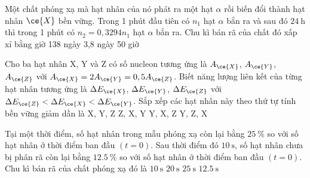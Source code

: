 \begin{ex}
	Một chất phóng xạ mà hạt nhân của nó phát ra một hạt $\alpha$ rồi biến đổi thành hạt nhân $\ce{X}$ bền vững. Trong 1 phút đầu tiên có $n_1$ hạt $\alpha$ bắn ra và sau đó $\SI{24}{\hour}$ thì trong 1 phút có $n_2=0,3294n_1$ hạt $\alpha$ bắn ra. Chu kì bán rã của chất đó xấp xỉ bằng
	\choice
	{ giờ}
	{138 ngày}
	{3,8 ngày}
	{50 giờ}
\end{ex}
\begin{ex}
	Cho ba hạt nhân X, Y và Z có số nucleon tương ứng là $A_{\ce{X}}$, $A_{\ce{Y}}$, $A_{\ce{Z}}$ với $A_{\ce{X}}=2A_{\ce{Y}}=0,5A_{\ce{Z}}$. Biết năng lượng liên kết của từng hạt nhân tương ứng là $\Delta E_{\ce{X}}$, $\Delta E_{\ce{Y}}$, $\Delta E_{\ce{Z}}$ với $\Delta E_{\ce{Z}}<\Delta E_{\ce{X}}<\Delta E_{\ce{Y}}$. Sắp xếp các hạt nhân này theo thứ tự tính bền vững giảm dần là
	\choice
	{X, Y, Z}
	{Z, X, Y}
	{\True Y, X, Z}
	{Y, Z, X}
	\loigiai{}
\end{ex}
\begin{ex}
	Tại một thời điểm, số hạt nhân trong mẫu phóng xạ còn lại bằng $\SI{25}{\percent}$ so với số hạt nhân ở thời điểm ban đầu $\left(t=0\right)$. Sau thời điểm đó $\SI{10}{\second}$, số hạt nhân chưa bị phân rã còn lại bằng $\SI{12.5}{\percent}$ so với số hạt nhân ở thời điểm ban đầu $\left(t=0\right)$. Chu kì bán rã của chất phóng xạ đó là
	\choice
	{\True $\SI{10}{\second}$}
	{$\SI{20}{\second}$}
	{$\SI{25}{\second}$}
	{$\SI{12.5}{\second}$}
\end{ex}
